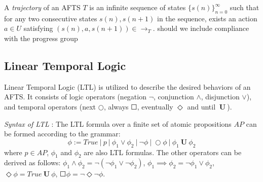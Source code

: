 A \emph{trajectory} of an AFTS $T$ is an infinite sequence of states $\{s(n)\}_{n=0}^{\infty}$ 
such that for any two consecutive states $s(n), s(n+1)$ in the sequence, exists an action $a\in U$ satisfying $(s(n),a,s(n+1))\in \rightarrow_T$. {\color{red}should we include compliance with the progress group}

\subsection{Linear Temporal Logic}

Linear Temporal Logic (LTL) is utilized to describe the desired behaviors of an AFTS. It consists of logic operators (negation $ \neg $, conjunction $ \wedge $, disjunction $ \vee $), and temporal operators (next $ \bigcirc $, always $ \Square $, eventually $ \Diamond $ and until $ \mathbf{\ U\ }$).


{\color{black}\emph{ Syntax of LTL} \cite{baier2008principles}: The LTL formula over a finite set of atomic propositions $ AP $ can be formed according to the grammar:}
\begin{displaymath}
\phi := True\ \vert\ p\ \vert\ \phi_1 \vee \phi_2\ \vert\ \neg \phi\ \vert\ \bigcirc \phi\ \vert\ \phi_1 \mathbf{\ U\ }\phi_2
\end{displaymath}
where $ p\in AP $, $ \phi_1 $ and $ \phi_2 $ are also LTL formulas. The other operators can be derived as follows: $ \phi_1 \wedge \phi_2 = \neg (\neg \phi_1 \vee \neg \phi_2) $, $ \phi_1 \implies \phi_2 = \neg \phi_1 \vee \phi_2 $, $ \Diamond \phi = True \mathbf{\ U\ } \phi $, $ \Square \phi = \neg \Diamond \neg \phi $.

